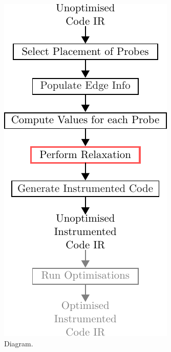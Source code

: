 \begin{figure}[h]
  \centering
  \includegraphics[scale=0.9]{figs/relax-instr-diagram.pdf}
  \caption{Diagram.}
  \label{fig:relax-instr-diagram}
\end{figure}



